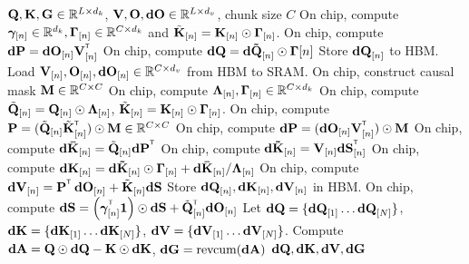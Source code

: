 \begin{algorithm}[tbh!]
\small
\caption{Backward pass for gated linear attention (w/o. materialization)}
\label{algo:gla-chunk-scan-2-bwd}
\begin{algorithmic}
    \Require ${\mathbf{Q}}, {\mathbf{K}}, {\mathbf{G}} \in \mathbb{R}^{L \times d_k}$, ${\mathbf{V}}, {\mathbf{O}}, {\mathbf{dO}} \in \mathbb{R}^{L \times d_v}$, chunk size $C$
        \State On chip, compute ${\bm{\gamma}}_{[n]} \in \mathbb{R}^{d_k}, {\mathbf{\Gamma}}_{[n]} \in \mathbb{R}^{C \times d_k}$ and $\tilde {{\mathbf{K}}}_{[n]} = {\mathbf{K}}_{[n]} \odot {\mathbf{\Gamma}}_{[n]}$.
        \State On chip, compute $\rmdP = \rmdO_{[n]} \rmV_{[n]}^\intercal $
        \State On chip, compute ${\mathbf{dQ}}= {\mathbf{d\tilde Q}}_{[n]} \odot {\mathbf{\Gamma}}{[n]} $
        \State Store ${\mathbf{dQ}}_{[n]}$ to HBM.
      \EndFor
        \State Load ${\mathbf{V}}_{[n]}, {\mathbf{O}}_{[n]}, {\mathbf{dO}}_{[n]} \in \mathbb{R}^{C \times d_v}$ from HBM to  SRAM.
        \State On chip, construct causal mask ${\mathbf{M}}\in \mathbb{R}^{C\times C}$ %
        \State On chip, compute ${\mathbf{\Lambda}}_{[n]}, {\mathbf{\Gamma}}_{[n]} \in \mathbb{R}^{C \times d_k}$
        \State On chip, compute $\tilde {{\mathbf{Q}}}_{[n]} = {\mathbf{Q}}_{[n]} \odot {\mathbf{\Lambda}}_{[n]}$, $\tilde {{\mathbf{K}}}_{[n]} = {\mathbf{K}}_{[n]} \odot {\mathbf{\Gamma}}_{[n]}$.
        \State On chip, compute $\rmP = (\tilde \rmQ_{[n]} \tilde \rmK^\intercal_{[n]})\odot \rmM  \in \R^{C \times C} $
        \State On chip, compute $\rmdP = (\rmdO_{[n]} \rmV_{[n]}^\intercal) \odot \rmM $
                \State On chip, compute $ \rmdbK_{[n]} = \tilde \rmQ_{[n]} \rmdP^\intercal$
        \State On chip, compute $ \rmdtK_{[n]} = \rmV_{[n]} \rmdS_{[n]}  ^\intercal$
        \State On chip, compute ${\mathbf{dK}}_{[n]} =  {\mathbf{d \tilde K}}_{[n]} \odot {\mathbf{\Gamma}}_{[n]}  + {\mathbf{d \bar K}}_{[n]} / {\mathbf{\Lambda}}_{[n]} $
        \State On chip, compute $\rmdV_{[n]} = \rmP^\intercal \, \rmdO_{[n]} + \tilde \rmK_{[n]} \rmdS $
        \State Store ${\mathbf{dQ}}_{[n]}, {\mathbf{dK}}_{[n]}, {\mathbf{dV}}_{[n]}$ in HBM.
        \State On chip, compute $\rmdS = \left(\bgamma_{[n]}^\intercal \mathbf{1} \right) \odot \rmdS + \tilde \rmQ_{[n]}^\intercal \rmdO_{[n]}$
      \EndFor
  \State Let ${\mathbf{dQ}} = \{ {\mathbf{dQ}}_{[1]} \dots {\mathbf{dQ}}_{[N]} \}$, ${\mathbf{dK}}=\{ {\mathbf{dK}}_{[1]} \dots {\mathbf{dK}}_{[N]} \}$, ${\mathbf{dV}}=\{ {\mathbf{dV}}_{[1]} \dots {\mathbf{dV}}_{[N]} \}$.
  \State Compute ${\mathbf{dA}} = {\mathbf{Q}} \odot {\mathbf{dQ}} - {\mathbf{K}} \odot {\mathbf{dK}} $, ${\mathbf{dG}} = \text{revcum}({\mathbf{dA}}) $
  \State \Return ${\mathbf{dQ}}, {\mathbf{dK}}, {\mathbf{dV}}, {\mathbf{dG}}$
\end{algorithmic}
\end{algorithm}